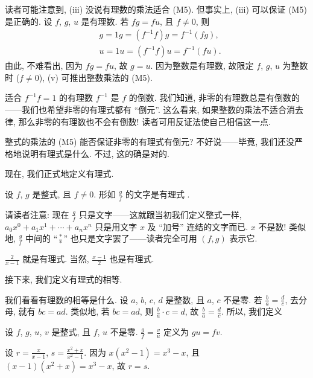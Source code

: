 读者可能注意到, (iii) 没说有理数的乘法适合 (M5). 但事实上, (iii) 可以保证 (M5) 是正确的. 设 $f$, $g$, $u$ 是有理数. 若 $fg = fu$, 且 $f \neq 0$, 则
\begin{align*}
     & g = 1g = (f^{-1} f) g = f^{-1} (fg), \\
     & u = 1u = (f^{-1} f) u = f^{-1} (fu).
\end{align*}
由此, 不难看出, 因为 $fg = fu$, 故 $g = u$. 因为整数是有理数, 故限定 $f$, $g$, $u$ 为整数时 ($f \neq 0$), (v) 可推出整数乘法的 (M5).

适合 $f^{-1} f = 1$ 的有理数 $f^{-1}$ 是 $f$ 的倒数. 我们知道, 非零的有理数总是有倒数的——我们也希望非零的有理式都有 ``倒元''. 这么看来, 如果整数的乘法不适合消去律, 那么非零的有理数也不会有倒数! 读者可用反证法使自己相信这一点.

整式的乘法的 (M5) 能否保证非零的有理式有倒元? 不好说——毕竟, 我们还没严格地说明有理式是什么. 不过, 这的确是对的.

现在, 我们正式地定义有理式.

\begin{proposition}
    设 $f$, $g$ 是整式, 且 $f \neq 0$. 形如 $\frac{g}{f}$ 的文字是有理式 .
\end{proposition}

\begin{remark}
    请读者注意: 现在 $\frac{g}{f}$ 只是文字——这就跟当初我们定义整式一样, $a_0 x^0 + a_1 x^1 + \cdots + a_n x^n$ 只是用文字 $x$ 及 ``加号'' 连结的文字而已. $x$ 不是数! 类似地, $\frac{g}{f}$ 中间的 ``$\frac{\ast}{\ast}$'' 也只是文字罢了——读者完全可用 $(f,g)$ 表示它.
\end{remark}

\begin{example}
    $\frac{2}{x-1}$ 就是有理式. 当然, $\frac{x-1}{2}$ 也是有理式.
\end{example}

接下来, 我们定义有理式的相等.

我们看看有理数的相等是什么. 设 $a$, $b$, $c$, $d$ 是整数, 且 $a$, $c$ 不是零. 若 $\frac{b}{a} = \frac{d}{c}$, 去分母, 就有 $bc = ad$. 类似地, 若 $bc = ad$, 则 $\frac{b}{a} \cdot c = d$, 故 $\frac{b}{a} = \frac{d}{c}$. 所以, 我们定义
\begin{definition}
    设 $f$, $g$, $u$, $v$ 是整式, 且 $f$, $u$ 不是零. $\frac{g}{f} = \frac{v}{u}$ 定义为 $gu = fv$.
\end{definition}

\begin{example}
    设 $r = \frac{x}{x - 1}$, $s = \frac{x^2 + x}{x^2 - 1}$. 因为 $x(x^2 - 1) = x^3 - x$, 且 $(x - 1)(x^2 + x) = x^3 - x$, 故 $r = s$.
\end{example}

